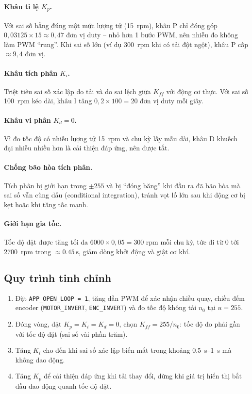 \paragraph{Khâu tỉ lệ $K_p$.} Với sai số bằng đúng một mức lượng tử (\SI{15}{rpm}), khâu P chỉ đóng góp $0{,}03125\times15\approx0{,}47$ đơn vị duty -- nhỏ hơn 1 bước PWM, nên nhiễu đo không làm PWM ``rung''. Khi sai số lớn (ví dụ \SI{300}{rpm} khi có tải đột ngột), khâu P cấp $\approx9{,}4$ đơn vị.

\paragraph{Khâu tích phân $K_i$.} Triệt tiêu sai số xác lập do tải và do sai lệch giữa $K_{ff}$ với động cơ thực. Với sai số \SI{100}{rpm} kéo dài, khâu I tăng $0{,}2\times100=20$ đơn vị duty mỗi giây.

\paragraph{Khâu vi phân $K_d=0$.} Vì đo tốc độ có nhiễu lượng tử \SI{15}{rpm} và chu kỳ lấy mẫu dài, khâu D khuếch đại nhiễu nhiều hơn là cải thiện đáp ứng, nên được tắt.

\paragraph{Chống bão hòa tích phân.} Tích phân bị giới hạn trong $\pm255$ và bị ``đóng băng'' khi đầu ra đã bão hòa mà sai số vẫn cùng dấu (conditional integration), tránh vọt lố lớn sau khi động cơ bị kẹt hoặc khi tăng tốc mạnh.

\paragraph{Giới hạn gia tốc.} Tốc độ đặt được tăng tối đa $6000\times0{,}05=300$ rpm mỗi chu kỳ, tức đi từ 0 tới \SI{2700}{rpm} trong $\approx\SI{0.45}{\second}$, giảm dòng khởi động và giật cơ khí.

\subsection{Quy trình tinh chỉnh}
\begin{enumerate}
  \item Đặt \texttt{APP\_OPEN\_LOOP = 1}, tăng dần PWM để xác nhận chiều quay, chiều đếm encoder (\texttt{MOTOR\_INVERT}, \texttt{ENC\_INVERT}) và đo tốc độ không tải $n_0$ tại $u=255$.
  \item Đóng vòng, đặt $K_p=K_i=K_d=0$, chọn $K_{ff}=255/n_0$: tốc độ đo phải gần với tốc độ đặt (sai số vài phần trăm).
  \item Tăng $K_i$ cho đến khi sai số xác lập biến mất trong khoảng \SIrange{0.5}{1}{\second} mà không dao động.
  \item Tăng $K_p$ để cải thiện đáp ứng khi tải thay đổi, dừng khi giá trị hiển thị bắt đầu dao động quanh tốc độ đặt.
\end{enumerate}

